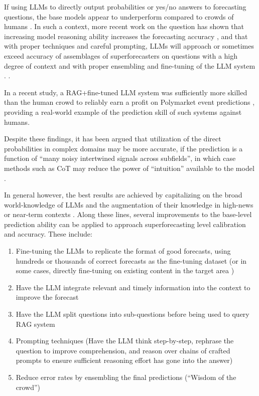 \documentclass[12pt,a4paper]{article}
\begin{document}
If using LLMs to directly output probabilities or yes/no answers to forecasting questions, the base models appear to underperform compared to crowds of humans  . In such a context, more recent work on the question has shown that increasing model reasoning ability increases the forecasting accuracy , and that with proper techniques and careful prompting, LLMs will approach or sometimes exceed accuracy of assemblages of superforecasters on questions with a high degree of context and with proper ensembling and fine-tuning of the LLM system .   . 

In a recent study, a RAG+fine-tuned LLM system was sufficiently more skilled than the human crowd to reliably earn a profit on Polymarket event predictions , providing a real-world example of the prediction skill of such systems against humans.

Despite these findings, it has been argued that utilization of the direct probabilities in complex domains may be more accurate, if the prediction is a function of ``many noisy intertwined signals across subfields'', in which case methods such as CoT may reduce the power of ``intuition'' available to the model .

In general however, the best results are achieved by capitalizing on the broad world-knowledge of LLMs and the augmentation of their knowledge in high-news or near-term contexts . Along these lines, several improvements to the base-level prediction ability can be applied to approach superforecasting level calibration and accuracy. These include: 
\begin{enumerate}
\item Fine-tuning the LLMs to replicate the format of good forecasts, using hundreds or thousands of correct forecasts as the fine-tuning dataset (or in some cases, directly fine-tuning on existing content in the target area )
\item Have the LLM integrate relevant and timely information into the context to improve the forecast
\item Have the LLM split questions into sub-questions before being used to query RAG system
\item Prompting techniques (Have the LLM think step-by-step, rephrase the question to improve comprehension, and reason over chains of crafted prompts to ensure sufficient reasoning effort has gone into the answer)
\item Reduce error rates by ensembling the final predictions (``Wisdom of the crowd'')
\end{enumerate}
\end{document}
